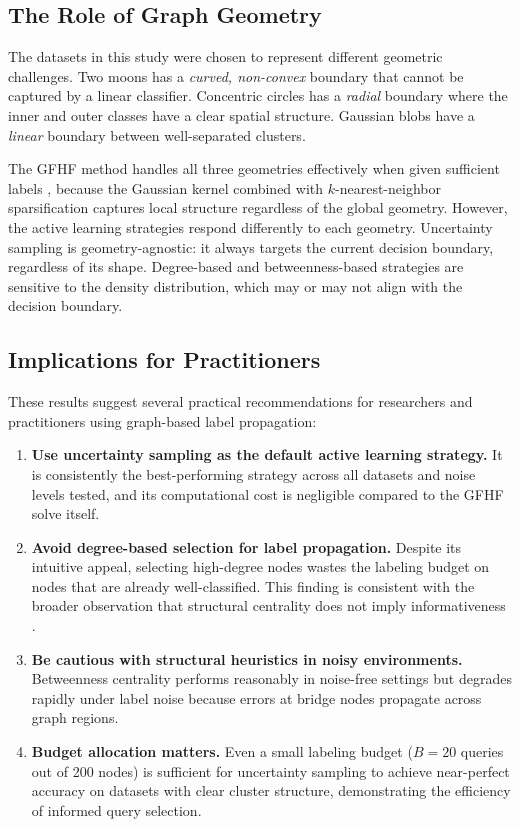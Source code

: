 \documentclass[12pt]{article}
\begin{document}
\subsection{The Role of Graph Geometry}

The datasets in this study were chosen to represent different geometric challenges. Two moons has a \textit{curved, non-convex} boundary that cannot be captured by a linear classifier. Concentric circles has a \textit{radial} boundary where the inner and outer classes have a clear spatial structure. Gaussian blobs have a \textit{linear} boundary between well-separated clusters.

The GFHF method handles all three geometries effectively when given sufficient labels \cite{Zhu2003}, because the Gaussian kernel combined with $k$-nearest-neighbor sparsification captures local structure regardless of the global geometry. However, the active learning strategies respond differently to each geometry. Uncertainty sampling is geometry-agnostic: it always targets the current decision boundary, regardless of its shape. Degree-based and betweenness-based strategies are sensitive to the density distribution, which may or may not align with the decision boundary.

\subsection{Implications for Practitioners}

These results suggest several practical recommendations for researchers and practitioners using graph-based label propagation:

\begin{enumerate}
\item \textbf{Use uncertainty sampling as the default active learning strategy.} It is consistently the best-performing strategy across all datasets and noise levels tested, and its computational cost is negligible compared to the GFHF solve itself.

\item \textbf{Avoid degree-based selection for label propagation.} Despite its intuitive appeal, selecting high-degree nodes wastes the labeling budget on nodes that are already well-classified. This finding is consistent with the broader observation that structural centrality does not imply informativeness \cite{Settles2012}.

\item \textbf{Be cautious with structural heuristics in noisy environments.} Betweenness centrality performs reasonably in noise-free settings but degrades rapidly under label noise because errors at bridge nodes propagate across graph regions.

\item \textbf{Budget allocation matters.} Even a small labeling budget ($B = 20$ queries out of 200 nodes) is sufficient for uncertainty sampling to achieve near-perfect accuracy on datasets with clear cluster structure, demonstrating the efficiency of informed query selection.
\end{enumerate}
\end{document}
